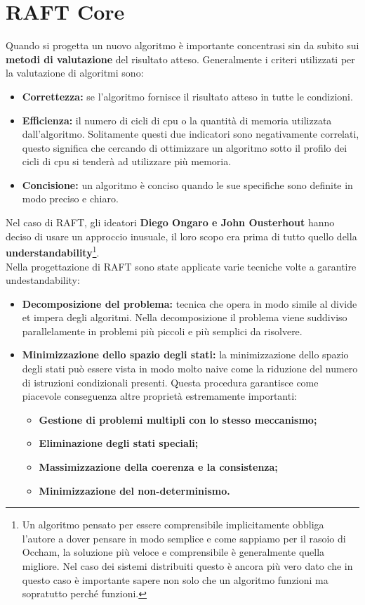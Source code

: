 	\section{RAFT Core}
    Quando si progetta un nuovo algoritmo è importante concentrasi sin da subito sui \textbf{metodi di valutazione} del risultato atteso. Generalmente i criteri utilizzati per la valutazione di algoritmi sono: 
    \begin{itemize}
      \item{\textbf{Correttezza:}}
      se l'algoritmo fornisce il risultato atteso in tutte le condizioni.
      \item{\textbf{Efficienza:}} 
      il numero di cicli di cpu o la quantità di memoria utilizzata dall'algoritmo. Solitamente questi due indicatori sono negativamente correlati, questo significa che cercando di ottimizzare un algoritmo sotto il profilo dei cicli di cpu si tenderà ad utilizzare più memoria.
      \item{\textbf{Concisione:}}
      un algoritmo è conciso quando le sue specifiche sono definite in modo preciso e chiaro.
    \end{itemize}
    Nel caso di RAFT, gli ideatori \textbf{Diego Ongaro e John Ousterhout} \cite[raftPaper]{raftPaper} \cite[ongaro:2014]{ongaro:2014} hanno deciso di usare un approccio inusuale, il loro scopo era prima di tutto quello della \textbf{understandability}\footnote{Un algoritmo pensato per essere comprensibile implicitamente obbliga l'autore a dover pensare in modo semplice e come sappiamo per il rasoio di Occham, la soluzione più veloce e comprensibile è generalmente quella migliore. Nel caso dei sistemi distribuiti questo è ancora più vero dato che in questo caso è importante sapere non solo che un algoritmo funzioni ma sopratutto perché funzioni.}.\\
    Nella progettazione di RAFT sono state applicate varie tecniche volte a garantire undestandability:
    \begin{itemize}
      \item{\textbf{Decomposizione del problema:}}
      tecnica che opera in modo simile al divide et impera degli algoritmi. Nella decomposizione il problema viene suddiviso parallelamente in problemi più piccoli e più semplici da risolvere.
      \item{\textbf{Minimizzazione dello spazio degli stati:}}
      la minimizzazione dello spazio degli stati può essere vista in modo molto naive come la riduzione del numero di istruzioni condizionali presenti. Questa procedura garantisce come piacevole conseguenza altre proprietà estremamente importanti:
      \begin{itemize}
        \item{\textbf{Gestione di problemi multipli con lo stesso meccanismo;}}
        \item{\textbf{Eliminazione degli stati speciali;}}
        \item{\textbf{Massimizzazione della coerenza e la consistenza;}}
        \item{\textbf{Minimizzazione del non-determinismo.}}
      \end{itemize}
    \end{itemize}
